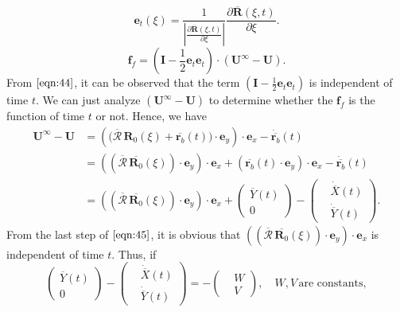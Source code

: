 \documentclass[lineno]{JFM-FLM_Au}
\begin{document}
\begin{equation}
	\label{eqn:43}
	\mathbf{e}_t(\xi)=\frac{1}{|\frac{\partial\overline{\mathbf{R}}(\xi,t)}{\partial\xi}|}\frac{\partial\overline{\mathbf{R}}(\xi,t)}{\partial\xi}.
\end{equation}
\begin{equation}
	\label{eqn:44}
	\mathbf{f}_{f}=\left(\mathbf{I}-\frac{1}{2}\mathbf{e}_t\mathbf{e}_t\right)\cdot(\mathbf{U}^{\infty}-\mathbf{U}).
\end{equation}
From $\eqref{eqn:44}$, it can be observed that the term $\left(\mathbf{I}-\frac{1}{2}\mathbf{e}_t\mathbf{e}_t\right)$ is independent of time $t$. We can just analyze $(\mathbf{U}^{\infty}-\mathbf{U})$ to determine whether the $\mathbf{f}_{f}$ is the function of time $t$ or not. Hence, we have 
\begin{equation}
	\label{eqn:45}
	\begin{aligned}
		\mathbf{U}^{\infty}-\mathbf{U}&=\left(\Big(\overline{\mathbf{\mathcal{R}}}\,\mathbf{R}_0(\xi)+\overline{\mathbf{r}_b}(t)\Big)\cdot\mathbf{e}_y\right)\cdot\mathbf{e}_x-\dot{\overline{\mathbf{r}_b}}(t)\\
		&=\left((\overline{\mathbf{\mathcal{R}}}\,\overline{\mathbf{R}_0}(\xi))\cdot\mathbf{e}_y\right)\cdot\mathbf{e}_x+(\overline{\mathbf{r}_b}(t)\cdot\mathbf{e}_y)\cdot\mathbf{e}_x-\dot{\overline{\mathbf{r}_b}}(t)\\
		&=\left((\overline{\mathbf{\mathcal{R}}}\,\overline{\mathbf{R}_0}(\xi))\cdot\mathbf{e}_y\right)\cdot\mathbf{e}_x+\left(\begin{aligned}
			\overline{Y}(t)\\
			0
		\end{aligned}\right)-\left(\begin{aligned}
			&\dot{\overline{X}}(t) \\
			&\dot{\overline{Y}}(t)
		\end{aligned}\right).
	\end{aligned}
\end{equation}
From the last step of $\eqref{eqn:45}$, it is obvious that $\left((\overline{\mathbf{\mathcal{R}}}\,\overline{\mathbf{R}_0}(\xi))\cdot\mathbf{e}_y\right)\cdot\mathbf{e}_x$ is independent of time $t$. Thus, if 
\begin{equation}
	\label{eqn:46}
	\left(\begin{aligned}
		\overline{Y}(t)\\
		0
	\end{aligned}\right)-\left(\begin{aligned}
		&\dot{\overline{X}}(t) \\
		&\dot{\overline{Y}}(t)
	\end{aligned}\right)=-\left(\begin{aligned}
		&W \\
		&V
	\end{aligned}\right), \quad W,V \,\text{are constants},
\end{equation}
\end{document}
